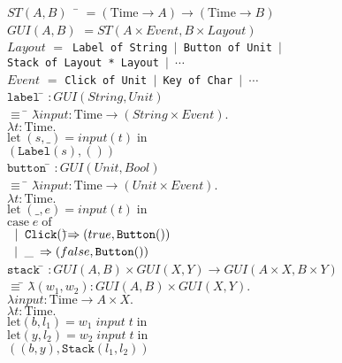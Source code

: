 \begin{tabbing}
$ST(A, B)\;\;$ \= $=(\mathrm{Time} \to A) \to (\mathrm{Time} \to B)$ \\[1em]

$GUI(A, B)$ \> $=ST(A \times Event, B \times Layout)$ \\[1em]

$Layout$ \> $=$\ \= \texttt{Label of String $|$ Button of Unit $|$} \\
         \> \> \texttt{Stack of Layout * Layout $|$ $\cdots$} \\[1em]

$Event$ \> $=$ \texttt{Click of Unit $|$ Key of Char $|$ $\cdots$}\\[1em]

$\mathtt{label}$ \= $ : GUI(String, Unit)$ \\
\> $ \equiv $ \= $\lambda $\=$input : \mathrm{Time} \to (String \times Event).\;$ \\
\> \> $\lambda t : \mathrm{Time}.\;$ \\
\> \> \> $\mathrm{let}\; (s, \_) = input(t)\; \mathrm{in}$ \\
\> \> \> $(\mathtt{Label}(s), ())$ \\[1em]

$\mathtt{button}$ \= $ : GUI(Unit, Bool)$ \\
\> $\equiv$ \= $\lambda$\=$ input: \mathrm{Time} \to (Unit \times Event).$\\
\> \> $\lambda t : \mathrm{Time}.$ \\
\> \> \> $\mathrm{let}\; (\_, e) = input(t) \;\mathrm{in}$\\
\> \> \> $\mathrm{case}\; e \; \mathrm{of}$ \\
\> \> \> $\;\;|\;\; \mathtt{Click()} $\=$\Rightarrow (true, \mathtt{Button}())$ \\
\> \> \> $\;\;|\;\; \_$ \> $\Rightarrow (false, \mathtt{Button}())$ \\[1em]

$\mathtt{stack}$ \= $ : GUI(A, B) \times GUI(X, Y) \to 
                        GUI(A \times X, B \times Y) $ \\
\> $\equiv$\= $\lambda$\=$(w_1, w_2) : GUI(A, B) \times GUI(X,Y).$\\
\> \> $\lambda input : \mathrm{Time} \to A \times X.$ \\
\> \> $\lambda t : \mathrm{Time}.$\\
\> \> \> $\mathrm{let} (b, l_1) = w_1\;input\;t \;\mathrm{in}$ \\
\> \> \> $\mathrm{let} (y, l_2) = w_2\;input\;t \;\mathrm{in}$ \\
\> \> \> $((b,y), \mathtt{Stack}(l_1, l_2))$ \\
\end{tabbing}

